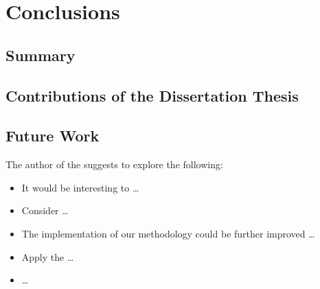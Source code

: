\chapter{Conclusions}
% 
\section{Summary}

\section{Contributions of the Dissertation Thesis}


\section{Future Work}
The author of the \thesis{} suggests to explore the following:
\begin{itemize}
\item It would be interesting to \dots

\item Consider \dots

\item The implementation of our methodology could be further improved \dots

\item Apply the \dots

\item \dots
\end{itemize}
